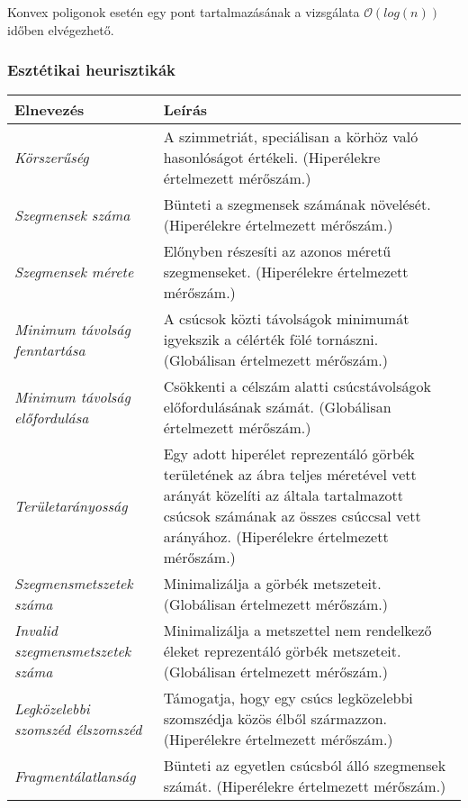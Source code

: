 \begin{note}
Konvex poligonok esetén egy pont tartalmazásának a vizsgálata $\mathcal{O}(log(n))$ időben elvégezhető\cite{point_polygon_test}.
\end{note}

\subsubsection{Esztétikai heurisztikák}

\begin{longtable}{| p{} | p{} |}
		\hline
		\textbf{Elnevezés} & \textbf{Leírás} \\
		\hline \hline %
		\emph{Körszerűség} & A szimmetriát, speciálisan a körhöz való hasonlóságot értékeli. (Hiperélekre értelmezett mérőszám.) \\
		\hline
		\emph{Szegmensek száma} & Bünteti a szegmensek számának növelését. (Hiperélekre értelmezett mérőszám.) \\
		\hline
		\emph{Szegmensek mérete} & Előnyben részesíti az azonos méretű szegmenseket. (Hiperélekre értelmezett mérőszám.) \\
		\hline
		\emph{Minimum távolság fenntartása} & A csúcsok közti távolságok minimumát igyekszik a célérték fölé tornászni. (Globálisan értelmezett mérőszám.)\\
		\hline
		\emph{Minimum távolság előfordulása} & Csökkenti a célszám alatti csúcstávolságok előfordulásának számát. (Globálisan értelmezett mérőszám.) \\
		\hline
		\emph{Területarányosság} & Egy adott hiperélet reprezentáló görbék területének az ábra teljes méretével vett arányát közelíti az általa tartalmazott csúcsok számának az összes csúccsal vett arányához. (Hiperélekre értelmezett mérőszám.) \\
		\hline
		\emph{Szegmensmetszetek száma} & Minimalizálja a görbék metszeteit. (Globálisan értelmezett mérőszám.)\\
		\hline
		\emph{Invalid szegmensmetszetek száma} & Minimalizálja a metszettel nem rendelkező éleket reprezentáló görbék metszeteit. (Globálisan értelmezett mérőszám.)\\
		\hline
		\emph{Legközelebbi szomszéd élszomszéd} & Támogatja, hogy egy csúcs legközelebbi szomszédja közös élből származzon. (Hiperélekre értelmezett mérőszám.)\\
		\hline
		\emph{Fragmentálatlanság} & Bünteti az egyetlen csúcsból álló szegmensek számát. (Hiperélekre értelmezett mérőszám.)\\
		\hline
\end{longtable}

